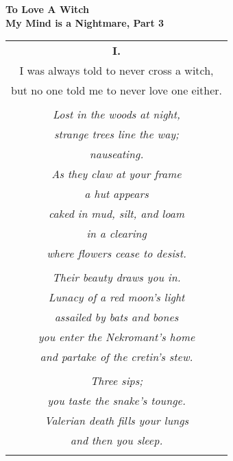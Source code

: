 \documentclass{article}
\begin{document}
\newcommand{\h}{\hspace*{4ex}}


\begin{center}
\textbf{To Love A Witch} \\ %
{\small\textbf{My Mind is a Nightmare, Part 3}} \\
\vspace*{2ex}
\begin{longtable}{c}
\textbf{I.} \\
I was always told to never cross a witch, \\
but no one told me to never love one either. \\
\\
\textit{Lost in the woods at night,} \\
\textit{strange trees line the way;} \\
\textit{nauseating.} \\
\textit{As they claw at your frame} \\
\textit{a hut appears} \\
\textit{caked in mud, silt, and loam} \\
\textit{in a clearing} \\
\textit{where flowers cease to desist.} \\
\\
\textit{Their beauty draws you in.} \\
\textit{Lunacy of a red moon's light} \\
\textit{assailed by bats and bones} \\
\textit{you enter the Nekromant's home} \\
\textit{and partake of the cretin's stew.} \\
\\
\textit{Three sips;} \\
\textit{you taste the snake's tounge.} \\
\textit{Valerian death fills your lungs} \\
\textit{and then you sleep.} \\
\\

\end{longtable}
\end{center}
\end{document}
